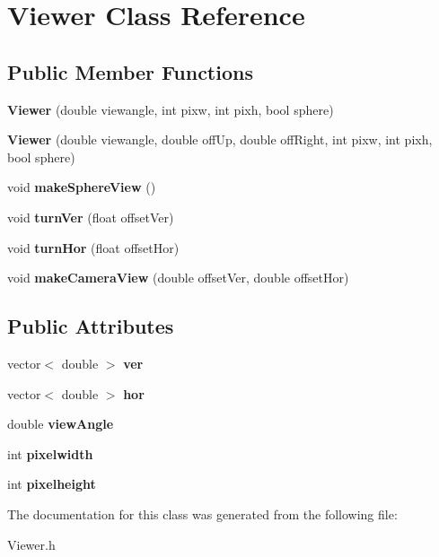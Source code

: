 \hypertarget{class_viewer}{}\section{Viewer Class Reference}
\label{class_viewer}
\subsection*{Public Member Functions}
\begin{DoxyCompactItemize}
\item 
\mbox{\label{class_viewer_a33116dd26d5b974555e2be22bafdaf51}} 
{\bfseries Viewer} (double viewangle, int pixw, int pixh, bool sphere)
\item 
\mbox{\label{class_viewer_a371e43a50d7e3a46a4f3ca71be33e114}} 
{\bfseries Viewer} (double viewangle, double off\+Up, double off\+Right, int pixw, int pixh, bool sphere)
\item 
\mbox{\label{class_viewer_a6cd6a04593760bebc53dd2ea65e05ef9}} 
void {\bfseries make\+Sphere\+View} ()
\item 
\mbox{\label{class_viewer_a88d0a770efda8448cd2cf8c732349747}} 
void {\bfseries turn\+Ver} (float offset\+Ver)
\item 
\mbox{\label{class_viewer_a11896b8af07683e47d2870b02207fbab}} 
void {\bfseries turn\+Hor} (float offset\+Hor)
\item 
\mbox{\label{class_viewer_afa7100afe5153161cb7302bc27e1bd3e}} 
void {\bfseries make\+Camera\+View} (double offset\+Ver, double offset\+Hor)
\end{DoxyCompactItemize}
\subsection*{Public Attributes}
\begin{DoxyCompactItemize}
\item 
\mbox{\label{class_viewer_ae43b36795a2f888dbe6f37a6b7dec6f6}} 
vector$<$ double $>$ {\bfseries ver}
\item 
\mbox{\label{class_viewer_ac5c90f62723ba5cc30f639d6c5a87133}} 
vector$<$ double $>$ {\bfseries hor}
\item 
\mbox{\label{class_viewer_a3d3acb4bfa6cb175b3bd36f9ed45ab42}} 
double {\bfseries view\+Angle}
\item 
\mbox{\label{class_viewer_ae060ab373ba5bd7b5dcbbee20069f4bf}} 
int {\bfseries pixelwidth}
\item 
\mbox{\label{class_viewer_a34e97ce85fd58c8a66d092611996c0d6}} 
int {\bfseries pixelheight}
\end{DoxyCompactItemize}


The documentation for this class was generated from the following file\+:\begin{DoxyCompactItemize}
\item 
Viewer.\+h\end{DoxyCompactItemize}
